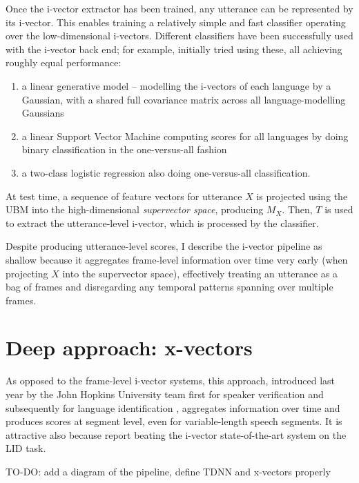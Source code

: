 \documentclass[bsc,frontabs,twoside,singlespacing,parskip,deptreport]{infthesis}
\begin{document}
{{    Once the i-vector extractor has been trained, any utterance can be represented by its i-vector. This enables training a relatively simple and fast classifier operating over the low-dimensional i-vectors. Different classifiers have been successfully used with the i-vector back end; for example, \citeauthor{Martinez_et_al_2011} initially tried using these, all achieving roughly equal performance:
    \begin{enumerate}
      \item {a linear generative model -- modelling the i-vectors of each language by a Gaussian, with a shared full covariance matrix across all language-modelling Gaussians}
      \item {a linear Support Vector Machine computing scores for all languages by doing binary classification in the one-versus-all fashion}
      \item {a two-class logistic regression also doing one-versus-all classification.}
    \end{enumerate}

    At test time, a sequence of feature vectors for utterance $X$ is projected using the UBM into the high-dimensional \textit{supervector space}, producing $M_X$. Then, $T$ is used to extract the utterance-level i-vector, which is processed by the classifier.

    Despite producing utterance-level scores, I describe the i-vector pipeline as shallow because it aggregates frame-level information over time very early (when projecting $X$ into the supervector space), effectively treating an utterance as a bag of frames and disregarding any temporal patterns spanning over multiple frames.
  }

  \section{Deep approach: x-vectors}{
    \label{sec:x-vectors}
    As opposed to the frame-level i-vector systems, this approach, introduced last year by the John Hopkins University team first for speaker verification \citep{Snyder_et_al_2018b} and subsequently for language identification \citep{Snyder_et_al_2018}, aggregates information over time and produces scores at segment level, even for variable-length speech segments. It is attractive also because \citeauthor{Snyder_et_al_2018} report beating the i-vector state-of-the-art system on the LID task.

    TO-DO: add a diagram of the pipeline, define TDNN and x-vectors properly
    
}}
\end{document}
